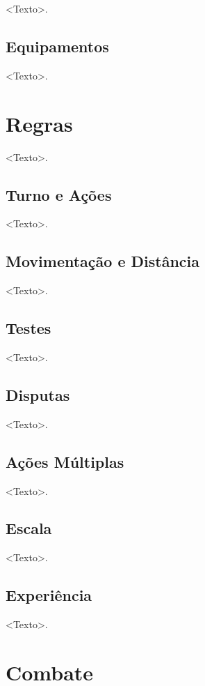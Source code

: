 \documentclass[a4paper, twocolumn, 10pt]{book}
\begin{document}
<Texto>.

\section{Equipamentos}

<Texto>.

\chapter{Regras}

<Texto>.

\section{Turno e Ações}

<Texto>.

\section{Movimentação e Distância}

<Texto>.

\section{Testes}

<Texto>.

\section{Disputas}

<Texto>.

\section{Ações Múltiplas}

<Texto>.

\section{Escala}

<Texto>.

\section{Experiência}

<Texto>.

\chapter{Combate}
\end{document}
